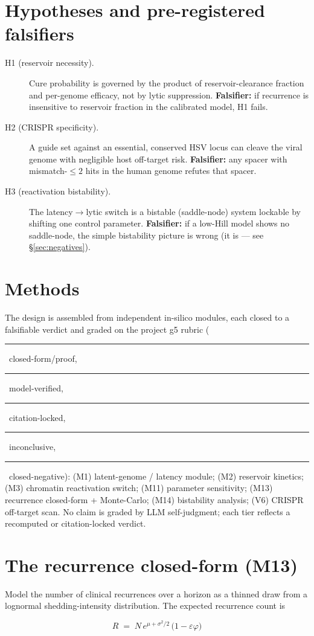 \documentclass[11pt,a4paper]{article}
\newcommand{\tierdisc}[1]{\textcolor{#1}{\rule[0.05ex]{1.0ex}{1.0ex}}}
\newcommand{\tierBlue}{\tierdisc{blue!70!black}}
\newcommand{\tierGreen}{\tierdisc{green!60!black}}
\newcommand{\tierYellow}{\tierdisc{yellow!85!black}}
\newcommand{\tierOrange}{\tierdisc{orange!90!black}}
\newcommand{\tierRed}{\tierdisc{red!80!black}}
\begin{document}
\section{Hypotheses and pre-registered falsifiers}
\label{sec:hypotheses}
\begin{description}
\item[H1 (reservoir necessity).] Cure probability is governed by the product of
reservoir-clearance fraction and per-genome efficacy, not by lytic suppression.
\textbf{Falsifier:} if recurrence is insensitive to reservoir fraction in the
calibrated model, H1 fails.
\item[H2 (CRISPR specificity).] A guide set against an essential, conserved HSV
locus can cleave the viral genome with negligible host off-target risk.
\textbf{Falsifier:} any spacer with mismatch-$\le 2$ hits in the human genome
refutes that spacer.
\item[H3 (reactivation bistability).] The latency$\to$lytic switch is a
bistable (saddle-node) system lockable by shifting one control parameter.
\textbf{Falsifier:} if a low-Hill model shows no saddle-node, the simple
bistability picture is wrong (it is --- see \S\ref{sec:negatives}).
\end{description}

\section{Methods}
\label{sec:methods}
The design is assembled from independent in-silico modules, each closed to a
falsifiable verdict and graded on the project g5 rubric
(\tierBlue{}~closed-form/proof, \tierGreen{}~model-verified,
\tierYellow{}~citation-locked, \tierOrange{}~inconclusive,
\tierRed{}~closed-negative): (M1) latent-genome / latency module; (M2)
reservoir kinetics; (M3) chromatin reactivation switch; (M11) parameter
sensitivity; (M13) recurrence closed-form + Monte-Carlo; (M14) bistability
analysis; (V6) CRISPR off-target scan. No claim is graded by LLM self-judgment;
each tier reflects a recomputed or citation-locked verdict.

\section{The recurrence closed-form (M13)}
\label{sec:recurrence}
Model the number of clinical recurrences over a horizon as a thinned draw from a
lognormal shedding-intensity distribution. The expected recurrence count is

\begin{equation}
\boxed{\;R \;=\; N\,e^{\mu + \sigma^{2}/2}\,\bigl(1 - \varepsilon\varphi\bigr)\;}
\label{eq:recurrence}
\end{equation}
\end{document}
